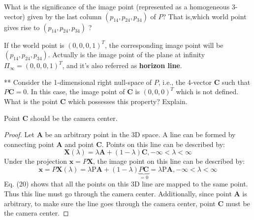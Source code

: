 \begin{questions}
\begin{parts}
\begin{subparts}
    \subpart
    What is the significance of the image point (represented as a homogeneous 3-vector) given by the last column $(p _ {14}, p_ {24}, p_ {34})$ of $P$? That is,which world point gives rise to  $(p _ {14}, p_ {24}, p_ {34})$ ?
    
    \begin{solution}
        If the world point is $(0,0,0,1) ^ {T}$, the corresponding image point will be $(p _ {14}, p_ {24}, p_ {34})$. Actually is the image point of the plane at infinity $\Pi _ {\infty} = (0,0,0,1) ^ {T}$, and it's also referred as \textbf{horizon line}. 
    \end{solution}
    
    \subpart
    ** Consider the 1-dimensional right null-space of $P$, i.e., the 4-vector $\mathbf{C}$ such that $P \mathbf{C}=0$. In this case, the image point of $\mathbf{C}$ is $(0, 0, 0) ^ {T}$ which is not defined. What is the point $\mathbf{C}$ which possesses this property? Explain.
    
    \begin{solution}
        Point $\mathbf{C}$ should be the camera center.
        \begin{proof}
            Let $\mathbf{A}$ be an arbitrary point in the 3D space. A line can be formed by connecting point $\mathbf{A}$ and point $\mathbf{C}$. Points on this line can be described by:
            \begin{equation}
                \mathbf { X } ( \lambda ) = \lambda \mathbf { A } + ( 1 - \lambda ) \mathbf { C } , - \infty < \lambda < \infty
            \end{equation}
            Under the projection $ \mathbf { x } = P \mathbf { X }$, the image point on this line can be described by:
            \begin{equation}
                \mathbf { x } = P \mathbf { X } ( \lambda ) = \lambda \mathrm { P } \mathbf { A } + ( 1 - \lambda ) \underbrace { P \mathbf { C } } _ { = 0 } = \lambda \mathrm { P } \mathbf { A } , - \infty < \lambda < \infty
            \end{equation}
            Eq. (20) shows that all the points on this 3D line are mapped to the same point. Thus this line must go through the camera center. Additionally, since point $\mathbf{A}$ is arbitrary, to make sure the line goes through the camera center, point $\mathbf{C}$ must be the camera center.
        \end{proof}
    \end{solution}
\end{subparts} 


\end{parts}
\end{questions}
